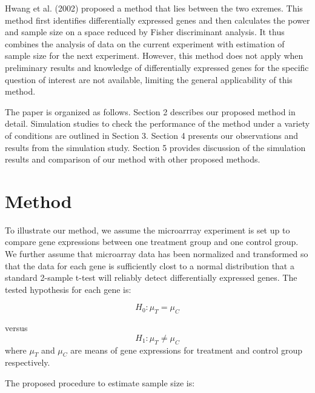 \documentclass{bioinfo}
\begin{document}
Hwang et al.  (2002) proposed a method that lies between the two
exremes.  This method first identifies differentially expressed genes
and then calculates the power and sample size on a space reduced by
Fisher discriminant analysis. It thus combines the analysis of data on
the current experiment with estimation of sample size for the next
experiment. However, this method does not apply when preliminary
results and knowledge of differentially expressed genes for the
specific question of interest are not available, limiting the general
applicability of this method.

The paper is organized as follows. Section 2 describes our proposed
method in detail. Simulation studies to check the performance of the
method under a variety of conditions are outlined in Section 3.
Section 4 presents our observations and results from the simulation
study.  Section 5 provides discussion of the simulation results and
comparison of our method with other proposed methods.

\section{Method}
To illustrate our method, we assume the microarrray experiment is set
up to compare gene expressions between one treatment group and one
control group. We further assume that microarray data has been
normalized and transformed so that the data for each gene is
sufficiently clost to a normal distribution that a standard 2-sample
t-test will reliably detect differentially expressed genes. The tested
hypothesis for each gene is:

\begin{equation}
  H_0: \mu_{T} = \mu_{C}  \nonumber
\end{equation}

versus
\begin{equation}
  H_1: \mu_{T} \neq \mu_{C} \nonumber
\end{equation}
where $\mu_{T}$ and $\mu_{C}$ are means of gene expressions for treatment and control group respectively.

The proposed procedure to estimate sample size is:
\end{document}
